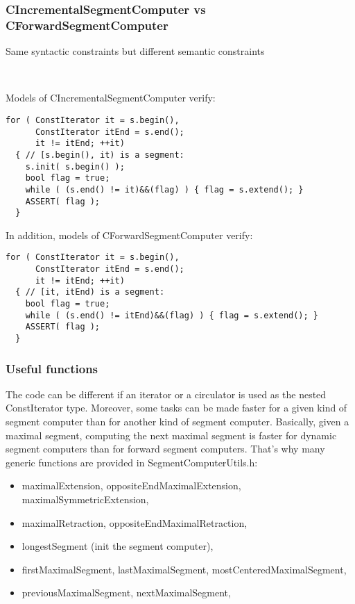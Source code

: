 \begin{frame}
  \frametitle{CIncrementalSegmentComputer vs CForwardSegmentComputer}

Same syntactic constraints but different semantic constraints

~

Models of CIncrementalSegmentComputer verify: 
  \begin{lstlisting}
for ( ConstIterator it = s.begin(), 
      ConstIterator itEnd = s.end();
      it != itEnd; ++it)
  { // [s.begin(), it) is a segment:
    s.init( s.begin() ); 
    bool flag = true; 
    while ( (s.end() != it)&&(flag) ) { flag = s.extend(); }
    ASSERT( flag ); 
  }
  \end{lstlisting}

In addition, models of CForwardSegmentComputer verify: 
  \begin{lstlisting}
for ( ConstIterator it = s.begin(), 
      ConstIterator itEnd = s.end();
      it != itEnd; ++it)
  { // [it, itEnd) is a segment:
    bool flag = true; 
    while ( (s.end() != itEnd)&&(flag) ) { flag = s.extend(); }
    ASSERT( flag ); 
  }
  \end{lstlisting}

\end{frame}

\begin{frame}
  \frametitle{Useful functions}
 
The code can be different if an iterator or a circulator is used as the nested ConstIterator type. Moreover, some tasks can be made faster for a given kind of segment computer than for another kind of segment computer. Basically, 
given a maximal segment, computing the next maximal segment is faster for dynamic segment computers than for forward segment computers. That's why many generic functions are provided in SegmentComputerUtils.h:

\begin{itemize}
 \item maximalExtension, oppositeEndMaximalExtension, maximalSymmetricExtension,
 \item maximalRetraction, oppositeEndMaximalRetraction,
 \item longestSegment (init the segment computer),
 \item firstMaximalSegment, lastMaximalSegment, mostCenteredMaximalSegment,
 \item previousMaximalSegment, nextMaximalSegment,
\end{itemize}



\end{frame}


